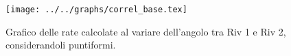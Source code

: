 \begin{figure}[h] \centering\texttt{[image: ../../graphs/correl\_base.tex]}\caption{Grafico delle rate calcolate al variare dell'angolo tra Riv 1 e Riv 2, considerandoli puntiformi.}\label{gr:correl_base} \end{figure}
